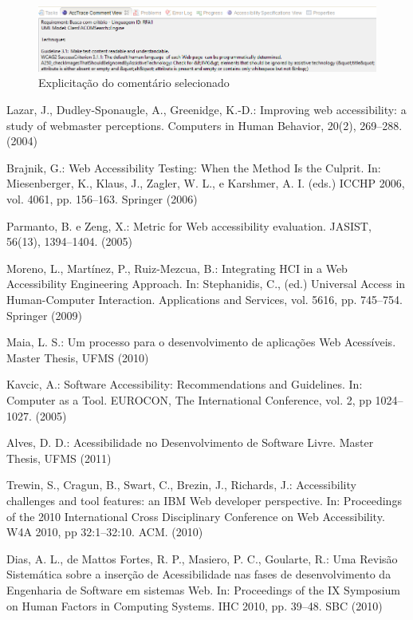 \documentclass[runningheads,a4paper]{llncs}
\begin{document}
\begin{figure}[h]
\centering
\includegraphics[scale=0.5]{./img/commentview.png}
\caption{Explicitação do comentário selecionado}
\label{fig:commentview}
\end{figure}

\begin{thebibliography}{4}

 Lazar, J., Dudley-Sponaugle, A.,  Greenidge, K.-D.: Improving web accessibility:
a study of webmaster perceptions. Computers in Human Behavior, 20(2), 269--288. (2004)

 Brajnik, G.: Web Accessibility Testing: When the Method Is the Culprit. In: Miesenberger, K., Klaus, J., Zagler, W. L., e Karshmer, A. I. (eds.) ICCHP 2006, vol. 4061, pp. 156--163. Springer (2006)

 Parmanto, B. e Zeng, X.: Metric for Web accessibility evaluation. JASIST, 56(13), 1394--1404. (2005)

 Moreno, L., Martínez, P., Ruiz-Mezcua, B.: Integrating HCI in a Web Accessibility Engineering Approach. In: Stephanidis, C., (ed.) Universal Access in Human-Computer Interaction. Applications and Services, vol. 5616, pp. 745--754. Springer (2009)

 Maia, L. S.: Um processo para o desenvolvimento de aplicações Web Acessíveis.
Master Thesis, UFMS (2010)

 Kavcic, A.: Software Accessibility: Recommendations and Guidelines. In: Computer as a Tool. EUROCON, The International Conference, vol. 2, pp 1024--1027. (2005)

 Alves, D. D.: Acessibilidade no Desenvolvimento de Software Livre. Master Thesis, UFMS (2011)

 Trewin, S., Cragun, B., Swart, C., Brezin, J., Richards, J.: Accessibility challenges
and tool features: an IBM Web developer perspective. In: Proceedings of the
2010 International Cross Disciplinary Conference on Web Accessibility. W4A 2010, pp 32:1--32:10. ACM. (2010)

 Dias, A. L., de Mattos Fortes, R. P., Masiero, P. C., Goularte, R.: Uma Revisão
Sistemática sobre a inserção de Acessibilidade nas fases de desenvolvimento da Engenharia
de Software em sistemas Web. In: Proceedings of the IX Symposium on Human
Factors in Computing Systems. IHC 2010, pp. 39--48. SBC (2010)


\end{thebibliography}
\end{document}
